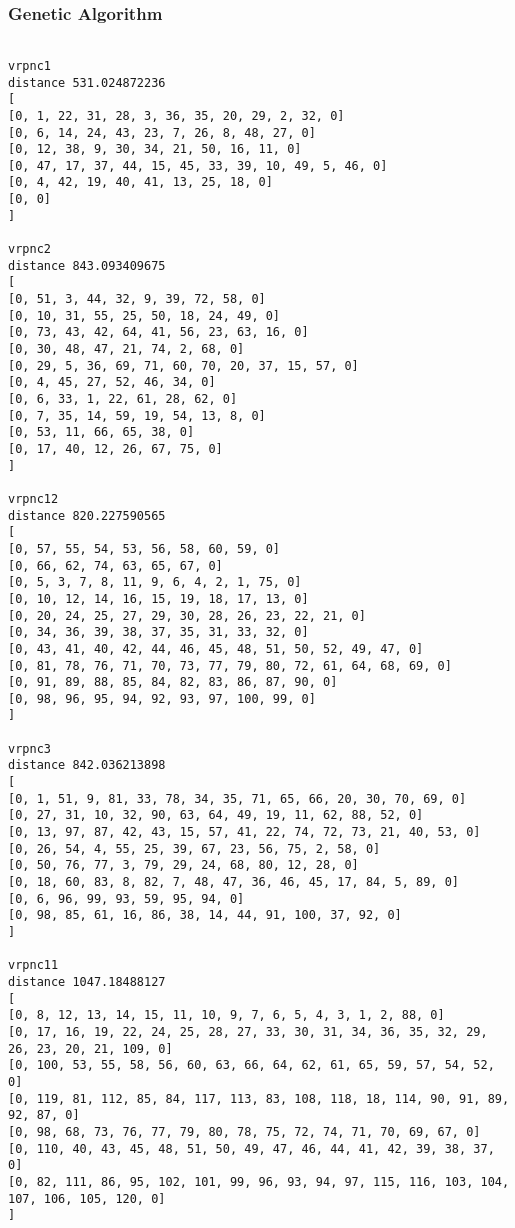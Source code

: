 \documentclass{article} %
\begin{document}
{\newpage
\subsubsection{Genetic Algorithm}
\begin{lstlisting}[breaklines, basicstyle=\tiny]

vrpnc1
distance 531.024872236
[
[0, 1, 22, 31, 28, 3, 36, 35, 20, 29, 2, 32, 0]
[0, 6, 14, 24, 43, 23, 7, 26, 8, 48, 27, 0]
[0, 12, 38, 9, 30, 34, 21, 50, 16, 11, 0]
[0, 47, 17, 37, 44, 15, 45, 33, 39, 10, 49, 5, 46, 0]
[0, 4, 42, 19, 40, 41, 13, 25, 18, 0]
[0, 0]
]

vrpnc2
distance 843.093409675
[
[0, 51, 3, 44, 32, 9, 39, 72, 58, 0]
[0, 10, 31, 55, 25, 50, 18, 24, 49, 0]
[0, 73, 43, 42, 64, 41, 56, 23, 63, 16, 0]
[0, 30, 48, 47, 21, 74, 2, 68, 0]
[0, 29, 5, 36, 69, 71, 60, 70, 20, 37, 15, 57, 0]
[0, 4, 45, 27, 52, 46, 34, 0]
[0, 6, 33, 1, 22, 61, 28, 62, 0]
[0, 7, 35, 14, 59, 19, 54, 13, 8, 0]
[0, 53, 11, 66, 65, 38, 0]
[0, 17, 40, 12, 26, 67, 75, 0]
]

vrpnc12
distance 820.227590565
[
[0, 57, 55, 54, 53, 56, 58, 60, 59, 0]
[0, 66, 62, 74, 63, 65, 67, 0]
[0, 5, 3, 7, 8, 11, 9, 6, 4, 2, 1, 75, 0]
[0, 10, 12, 14, 16, 15, 19, 18, 17, 13, 0]
[0, 20, 24, 25, 27, 29, 30, 28, 26, 23, 22, 21, 0]
[0, 34, 36, 39, 38, 37, 35, 31, 33, 32, 0]
[0, 43, 41, 40, 42, 44, 46, 45, 48, 51, 50, 52, 49, 47, 0]
[0, 81, 78, 76, 71, 70, 73, 77, 79, 80, 72, 61, 64, 68, 69, 0]
[0, 91, 89, 88, 85, 84, 82, 83, 86, 87, 90, 0]
[0, 98, 96, 95, 94, 92, 93, 97, 100, 99, 0]
]

vrpnc3
distance 842.036213898
[
[0, 1, 51, 9, 81, 33, 78, 34, 35, 71, 65, 66, 20, 30, 70, 69, 0]
[0, 27, 31, 10, 32, 90, 63, 64, 49, 19, 11, 62, 88, 52, 0]
[0, 13, 97, 87, 42, 43, 15, 57, 41, 22, 74, 72, 73, 21, 40, 53, 0]
[0, 26, 54, 4, 55, 25, 39, 67, 23, 56, 75, 2, 58, 0]
[0, 50, 76, 77, 3, 79, 29, 24, 68, 80, 12, 28, 0]
[0, 18, 60, 83, 8, 82, 7, 48, 47, 36, 46, 45, 17, 84, 5, 89, 0]
[0, 6, 96, 99, 93, 59, 95, 94, 0]
[0, 98, 85, 61, 16, 86, 38, 14, 44, 91, 100, 37, 92, 0]
]

vrpnc11
distance 1047.18488127
[
[0, 8, 12, 13, 14, 15, 11, 10, 9, 7, 6, 5, 4, 3, 1, 2, 88, 0]
[0, 17, 16, 19, 22, 24, 25, 28, 27, 33, 30, 31, 34, 36, 35, 32, 29, 26, 23, 20, 21, 109, 0]
[0, 100, 53, 55, 58, 56, 60, 63, 66, 64, 62, 61, 65, 59, 57, 54, 52, 0]
[0, 119, 81, 112, 85, 84, 117, 113, 83, 108, 118, 18, 114, 90, 91, 89, 92, 87, 0]
[0, 98, 68, 73, 76, 77, 79, 80, 78, 75, 72, 74, 71, 70, 69, 67, 0]
[0, 110, 40, 43, 45, 48, 51, 50, 49, 47, 46, 44, 41, 42, 39, 38, 37, 0]
[0, 82, 111, 86, 95, 102, 101, 99, 96, 93, 94, 97, 115, 116, 103, 104, 107, 106, 105, 120, 0]
]


\end{lstlisting}}
\end{document}
